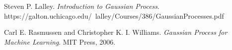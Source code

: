 \documentclass[[11pt,twoside,a4paper]{article}
\theoremstyle{definition}
\numberwithin{equation}{section}
\begin{document}
%
%
%
%
%
\newpage
\begin{thebibliography}{10}

Steven P. Lalley.
\textit{Introduction to Gaussian Process}. 
https://galton.uchicago.edu/~lalley/Courses/386/GaussianProcesses.pdf

Carl E. Rasmussen and Christopher K. I. Williams.
\textit{Gaussian Process for Machine Learning}. 
MIT Press, 2006.


%
%
%
%
%
\end{thebibliography}
%
\end{document}
